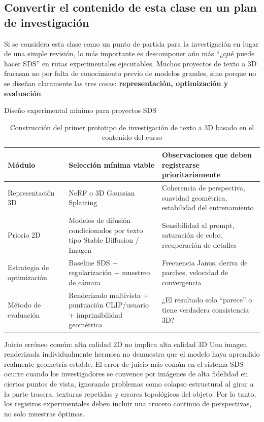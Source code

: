 \documentclass[a4paper]{article}
\begin{document}
\subsection{Convertir el contenido de esta clase en un plan de investigación}

Si se considera esta clase como un punto de partida para la investigación en lugar de una simple revisión, lo más importante es descomponer aún más ``¿qué puede hacer SDS'' en rutas experimentales ejecutables. Muchos proyectos de texto a 3D fracasan no por falta de conocimiento previo de modelos grandes, sino porque no se diseñan claramente las tres cosas: \textbf{representación, optimización y evaluación}.

\begin{knowledgebox}{Diseño experimental mínimo para proyectos SDS}
\begin{table}[H]
\centering
\begin{tabular}{p{} p{} p{}}
\toprule
Módulo & Selección mínima viable & Observaciones que deben registrarse prioritariamente \\
\midrule
Representación 3D & NeRF o 3D Gaussian Splatting & Coherencia de perspectiva, suavidad geométrica, estabilidad del entrenamiento \\
Priorio 2D & Modelos de difusión condicionados por texto tipo Stable Diffusion / Imagen & Sensibilidad al prompt, saturación de color, recuperación de detalles \\
Estrategia de optimización & Baseline SDS + regularización + muestreo de cámara & Frecuencia Janus, deriva de parches, velocidad de convergencia \\
Método de evaluación & Renderizado multivista + puntuación CLIP/usuario + imprimibilidad geométrica & ¿El resultado solo ``parece'' o tiene verdadera consistencia 3D? \\
\bottomrule
\end{tabular}
\caption{Construcción del primer prototipo de investigación de texto a 3D basado en el contenido del curso}
\end{table}
\end{knowledgebox}

\begin{warningbox}{Juicio erróneo común: alta calidad 2D no implica alta calidad 3D}
Una imagen renderizada individualmente hermosa no demuestra que el modelo haya aprendido realmente geometría estable. El error de juicio más común en el sistema SDS ocurre cuando los investigadores se convence por imágenes de alta fidelidad en ciertos puntos de vista, ignorando problemas como colapso estructural al girar a la parte trasera, texturas repetidas y errores topológicos del objeto. Por lo tanto, los registros experimentales deben incluir una crucero continuo de perspectivas, no solo muestras óptimas.
\end{warningbox}
\end{document}
